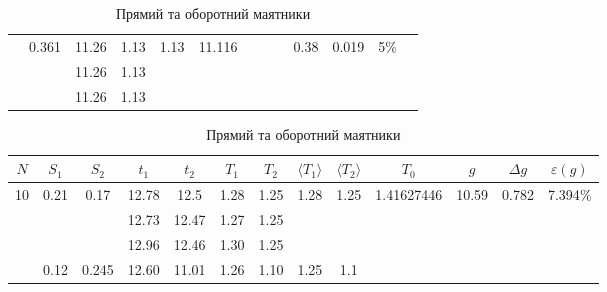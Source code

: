 \documentclass[a4paper,12pt]{article}
\begin{document}
\begin{table}[htp]
\begin{tabular}{|c|c|c|c|c|c|c|c|c|c|c|c|c|}
                    & \multirow{3}{*}{0.361} & 11.26 & 1.13 & \multirow{3}{*}{1.13}  & \multirow{3}{*}{11.116} &                       &                      &                        & \multirow{3}{*}{0.38}  & \multirow{3}{*}{0.019} & \multirow{3}{*}{5$\%$} &                                 \\ \cline{3-4}
                    &                        & 11.26 & 1.13 &                        &                       &                       &                      &                        &                        &                        &                        &                                 \\ \cline{3-4}
                    &                        & 11.26 & 1.13 &                        &                       &                       &                      &                        &                        &                        &                        &                                 \\ \hline
\end{tabular}
\caption{Прямий та оборотний маятники}
\begin{tabular}{|c|c|c|c|c|c|c|c|c|c|c|c|c|}
\hline
$N$                 & $S_1$                  & $S_2$                  & $t_1$ & $t_2$ & $T_1$ & $T_2$ & $\langle T_1\rangle$  & $\langle T_2\rangle$  & $T_0$                       & $g$                    & $\Delta g$             & $\varepsilon(g)$           \\ \hline
\multirow{9}{*}{10} & \multirow{3}{*}{0.21}  & \multirow{3}{*}{0.17}  & 12.78 & 12.5  & 1.28  & 1.25  & \multirow{3}{*}{1.28} & \multirow{3}{*}{1.25} & \multirow{9}{*}{1.41627446} & \multirow{9}{*}{10.59} & \multirow{9}{*}{0.782} & \multirow{9}{*}{7.394$\%$} \\ \cline{4-7}
                    &                        &                        & 12.73 & 12.47 & 1.27  & 1.25  &                       &                       &                             &                        &                        &                            \\ \cline{4-7}
                    &                        &                        & 12.96 & 12.46 & 1.30  & 1.25  &                       &                       &                             &                        &                        &                            \\ \cline{2-9}
                    & \multirow{3}{*}{0.12}  & \multirow{3}{*}{0.245} & 12.60 & 11.01 & 1.26  & 1.10  & \multirow{3}{*}{1.25} & \multirow{3}{*}{1.1}  &                             &                        &                        &                            \\ \cline{4-7}

\end{tabular}
\end{table}
\end{document}
